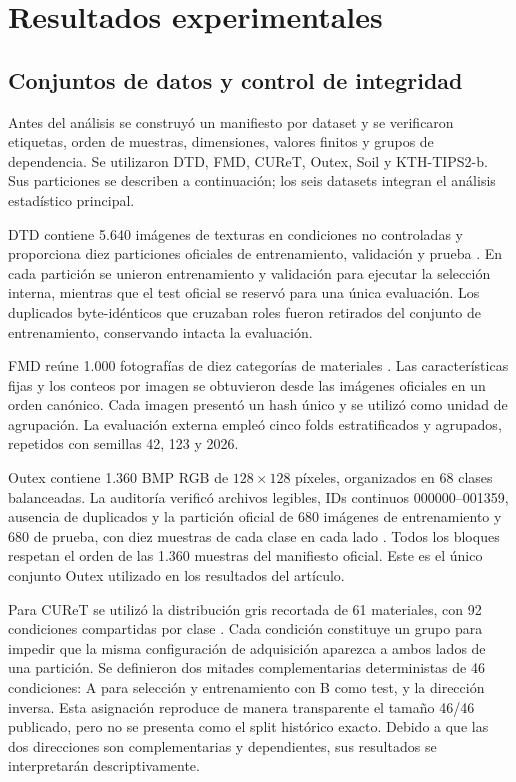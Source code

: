 \documentclass[a4paper,fleqn]{cas-sc}
\begin{document}
\section{Resultados experimentales}\label{sec:resultados-experimentales}

\subsection{Conjuntos de datos y control de integridad}

Antes del análisis se construyó un manifiesto por dataset y se verificaron etiquetas, orden de muestras, dimensiones, valores finitos y grupos de dependencia. Se utilizaron DTD, FMD, CUReT, Outex, Soil y KTH-TIPS2-b. Sus particiones se describen a continuación; los seis datasets integran el análisis estadístico principal.

DTD contiene 5.640 imágenes de texturas en condiciones no controladas y proporciona diez particiones oficiales de entrenamiento, validación y prueba \citep{cimpoi2014dtd}. En cada partición se unieron entrenamiento y validación para ejecutar la selección interna, mientras que el test oficial se reservó para una única evaluación. Los duplicados byte-idénticos que cruzaban roles fueron retirados del conjunto de entrenamiento, conservando intacta la evaluación.

FMD reúne 1.000 fotografías de diez categorías de materiales \citep{sharan2013fmd}. Las características fijas y los conteos por imagen se obtuvieron desde las imágenes oficiales en un orden canónico. Cada imagen presentó un hash único y se utilizó como unidad de agrupación. La evaluación externa empleó cinco folds estratificados y agrupados, repetidos con semillas 42, 123 y 2026.

Outex contiene 1.360 BMP RGB de $128\times128$ píxeles, organizados en 68 clases balanceadas. La auditoría verificó archivos legibles, IDs continuos 000000--001359, ausencia de duplicados y la partición oficial de 680 imágenes de entrenamiento y 680 de prueba, con diez muestras de cada clase en cada lado \citep{ojala2002outex}. Todos los bloques respetan el orden de las 1.360 muestras del manifiesto oficial. Este es el único conjunto Outex utilizado en los resultados del artículo.

Para CUReT se utilizó la distribución gris recortada de 61 materiales, con 92 condiciones compartidas por clase \citep{varma2003filter}. Cada condición constituye un grupo para impedir que la misma configuración de adquisición aparezca a ambos lados de una partición. Se definieron dos mitades complementarias deterministas de 46 condiciones: A para selección y entrenamiento con B como test, y la dirección inversa. Esta asignación reproduce de manera transparente el tamaño 46/46 publicado, pero no se presenta como el split histórico exacto. Debido a que las dos direcciones son complementarias y dependientes, sus resultados se interpretarán descriptivamente.
\end{document}
